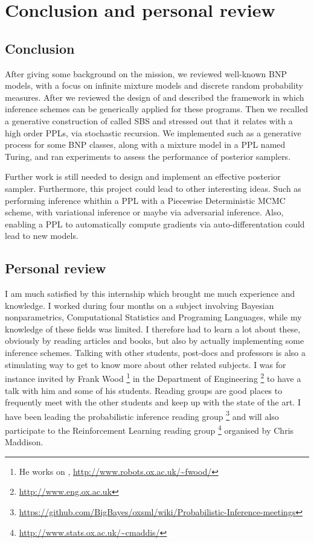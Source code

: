 
\chapter{Conclusion and personal review}

\section{Conclusion}
After giving some background on the mission, we reviewed well-known \acrlong{BNP} models, with a focus on infinite mixture models and discrete random probability measures. After we reviewed the design of  and described the framework in which inference schemes can be generically applied for these programs.
Then we recalled a generative construction of  called \acrlong{SBS} and stressed out that it relates with a high order \glspl{PPL}, via stochastic recursion.
We implemented such as a generative process for some \gls{BNP} classes, along with a mixture model in a \gls{PPL} named Turing, and ran experiments to assess the performance of posterior samplers.

Further work is still needed to design and implement an effective posterior sampler.
Furthermore, this project could lead to other interesting ideas. Such as performing inference whithin a \gls{PPL} with a Piecewise Deterministic \gls{MCMC} scheme, with variational inference or maybe via adversarial inference. Also, enabling a \gls{PPL} to automatically compute gradients via auto-differentation could lead to new models.


\section{Personal review}
I am much satisfied by this internship which brought me much experience and knowledge.
I worked during four months on a subject involving Bayesian nonparametrics, Computational Statistics and Programing Languages, while my knowledge of these fields was limited. I therefore had to learn a lot about these, obviously by reading articles and books, but also by actually implementing some inference schemes. Talking with other students, post-docs and professors is also a stimulating way to get to know more about other related subjects. I was for instance invited by Frank Wood \footnote{He works on , \url{http://www.robots.ox.ac.uk/~fwood/}} in the Department of Engineering \footnote{\url{http://www.eng.ox.ac.uk}} to have a talk with him and some of his students. Reading groups are good places to frequently meet with the other students and keep up with the state of the art. I have been leading the probabilistic inference reading group \footnote{\url{https://github.com/BigBayes/oxsml/wiki/Probabilistic-Inference-meetings}} and will also participate to the Reinforcement Learning reading group \footnote{\url{http://www.stats.ox.ac.uk/~cmaddis/}} organised by Chris Maddison.

